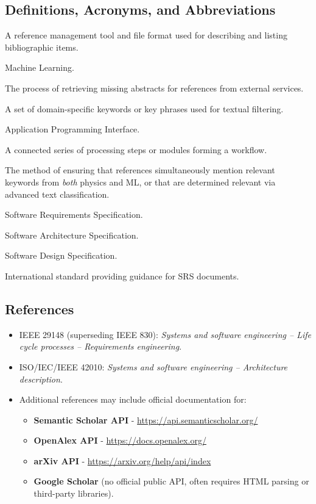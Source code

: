 \documentclass[12pt]{article}
\begin{document}
\subsection{Definitions, Acronyms, and Abbreviations}
\begin{description}[style=nextline]
  \item[BibTeX] A reference management tool and file format used for describing and listing bibliographic items. 
  \item[ML] Machine Learning.
  \item[Abstract Augmentation] The process of retrieving missing abstracts for references from external services.
  \item[Lexicon] A set of domain-specific keywords or key phrases used for textual filtering.
  \item[API] Application Programming Interface.
  \item[Pipeline] A connected series of processing steps or modules forming a workflow.
  \item[Filtering Intersection] The method of ensuring that references simultaneously mention relevant keywords from \emph{both} physics and ML, or that are determined relevant via advanced text classification.
  \item[SRS] Software Requirements Specification.
  \item[SAS] Software Architecture Specification.
  \item[SDS] Software Design Specification.
  \item[IEEE 29148] International standard providing guidance for SRS documents.
\end{description}

\subsection{References}
\begin{itemize}
  \item IEEE 29148 (superseding IEEE 830): \emph{Systems and software engineering – Life cycle processes – Requirements engineering}.
  \item ISO/IEC/IEEE 42010: \emph{Systems and software engineering – Architecture description}.
  \item Additional references may include official documentation for:
  \begin{itemize}
    \item \textbf{Semantic Scholar API} - \url{https://api.semanticscholar.org/}
    \item \textbf{OpenAlex API} - \url{https://docs.openalex.org/}
    \item \textbf{arXiv API} - \url{https://arxiv.org/help/api/index}
    \item \textbf{Google Scholar} (no official public API, often requires HTML parsing or third-party libraries).
  \end{itemize}
\end{itemize}
\end{document}
